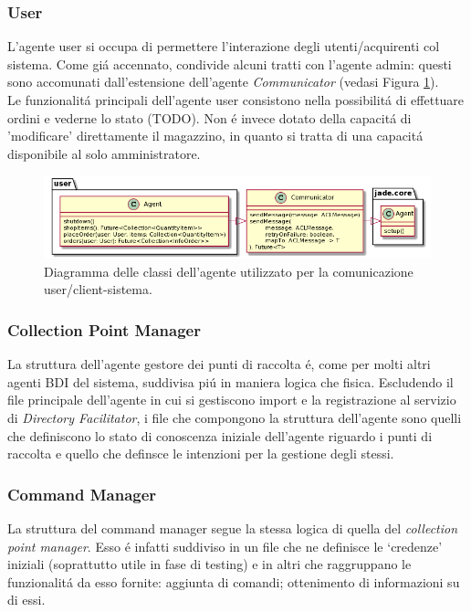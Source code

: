\subsubsection{User}
L'agente user si occupa di permettere l'interazione degli utenti/acquirenti col sistema. Come gi\'a accennato, condivide alcuni tratti con l'agente admin: questi sono accomunati dall'estensione dell'agente \textit{Communicator} (vedasi Figura \ref{fig:class_diagram_user_agent}).\\
Le funzionalit\'a principali dell'agente user consistono nella possibilit\'a di effettuare ordini e vederne lo stato (TODO). Non \'e invece dotato della capacit\'a di 'modificare' direttamente il magazzino, in quanto si tratta di una capacit\'a disponibile al solo amministratore.
\begin{figure}[!ht]\centering
    \includegraphics[width=\textwidth]{section/design/figure/user/class_diagram.png}
    \caption{Diagramma delle classi dell'agente utilizzato per la comunicazione user/client-sistema.}
    \label{fig:class_diagram_user_agent}
\end{figure}

\subsubsection{Collection Point Manager}
La struttura dell'agente gestore dei punti di raccolta \'e, come per molti altri agenti BDI del sistema, suddivisa pi\'u in maniera logica che fisica. Escludendo il file principale dell'agente in cui si gestiscono import e la registrazione al servizio di \textit{Directory Facilitator}, i file che compongono la struttura dell'agente sono quelli che definiscono lo stato di conoscenza iniziale dell'agente riguardo i punti di raccolta e quello che definsce le intenzioni per la gestione degli stessi.%

\subsubsection{Command Manager}
La struttura del command manager segue la stessa logica di quella del \textit{collection point manager}. Esso \'e infatti suddiviso in un file che ne definisce le `credenze' iniziali (soprattutto utile in fase di testing) e in altri che raggruppano le funzionalit\'a da esso fornite: aggiunta di comandi; ottenimento di informazioni su di essi.%

